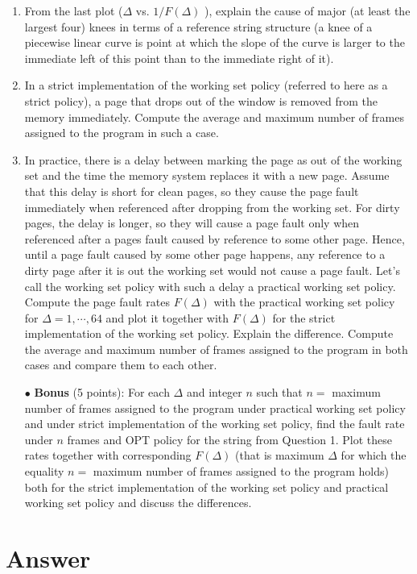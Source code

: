 \documentclass[12pt,letterpaper]{article}
\begin{document}
\begin{enumerate}
\item From the last plot ($\Delta$ vs. $1/F(\Delta)$ ), explain the cause of major (at least the
largest four) knees in terms of a reference string structure (a knee of a piecewise linear curve is
point at which the slope of the curve is larger to the immediate left of this point than to the
immediate right of it).

\item In a strict implementation of the working set policy (referred to here as a strict
policy), a page that drops out of the window is removed from the memory immediately.
Compute the average and maximum number of frames assigned to the program in such a case.

\item In practice, there is a delay between marking the page as out of the working
set and the time the memory system replaces it with a new page. Assume that this delay is
short for clean pages, so they cause the page fault immediately when referenced after dropping
from the working set. For dirty pages, the delay is longer, so they will cause a page fault only
when referenced after a pages fault caused by reference to some other page. Hence, until a
page fault caused by some other page happens, any reference to a dirty page after it is out the
working set would not cause a page fault. Let's call the working set policy with such a delay a
practical working set policy. Compute the page fault rates $F(\Delta)$ with the practical working set
policy for $\Delta = 1, \cdots, 64$ and plot it together with $F(\Delta)$ for the strict implementation of the
working set policy. Explain the difference. Compute the average and maximum number of
frames assigned to the program in both cases and compare them to each other.

\item[$\bullet$] {\bf Bonus} (5 points): For each $\Delta$ and integer $n$ such that $n =$ maximum number of
frames assigned to the program under practical working set policy and under strict
implementation of the working set policy, find the fault rate under $n$ frames and OPT policy
for the string from Question 1. Plot these rates together with corresponding $F(\Delta)$ (that is maximum
$\Delta$ for which the equality $n =$ maximum number of frames assigned to the program holds) both
for the strict implementation of the working set policy and practical working set policy and
discuss the differences.
\end{enumerate}

\part*{Answer}
\end{document}
